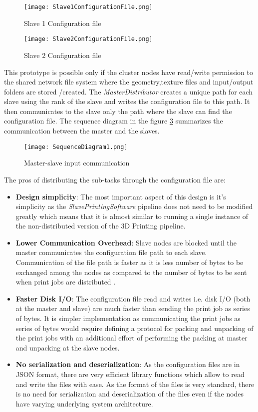 \begin{figure}[ht!]
\centering
\texttt{[image: Slave1ConfigurationFile.png]}
\caption{Slave 1 Configuration file}
\label{fig:Slave1ConfigurationFile}
\end{figure}

\begin{figure}[ht!]
\centering
\texttt{[image: Slave2ConfigurationFile.png]}
\caption{Slave 2 Configuration file}
\label{fig:Slave2ConfigurationFile}
\end{figure}

This prototype is possible only if the cluster nodes have read/write permission to the shared network file system where the geometry,texture files and input/output folders are stored /created. The \textit{MasterDistributor} creates a unique path for each slave using the rank of the slave and writes the configuration file to this path. It then communicates to the slave only the path where the slave can find the configuration file. The sequence diagram in the figure \ref{fig:SequenceDiagram1} summarizes the communication between the master and the slaves.  

\begin{figure}[ht!]
\centering
\texttt{[image: SequenceDiagram1.png]}
\caption{Master-slave input communication}
\label{fig:SequenceDiagram1}
\end{figure}

The pros of distributing the sub-tasks through the configuration file are:
\begin{itemize}
\item \textbf{Design simplicity}: The most important aspect of this design is it's simplicity as the \textit{SlavePrintingSoftware} pipeline does not need to be modified greatly which means that it is almost similar to running a single instance of the non-distributed version of the 3D Printing pipeline. 
\item \textbf{Lower Communication Overhead}: Slave nodes are blocked until the master communicates the configuration file path to each slave. Communication of the file path is faster as it is less number of bytes to be exchanged among the nodes as compared to the number of bytes to be sent when print jobs are distributed .
\item \textbf{Faster Disk I/O}: The configuration file read and writes i.e. disk I/O (both at the master and slave) are much faster than sending the print job as series of bytes. It is simpler implementation as communicating the print jobs as series of bytes would require defining a protocol for packing and unpacking of the print jobs with an additional effort of performing the packing at master and unpacking at the slave nodes.
\item \textbf{No serialization and deserialization}: As the configuration files are in JSON format, there are very efficient library functions which allow to read and write the files with ease. As the format of the files is very standard, there is no need for serialization and deserialization of the files even if the nodes have varying underlying system architecture.        
\end{itemize}


